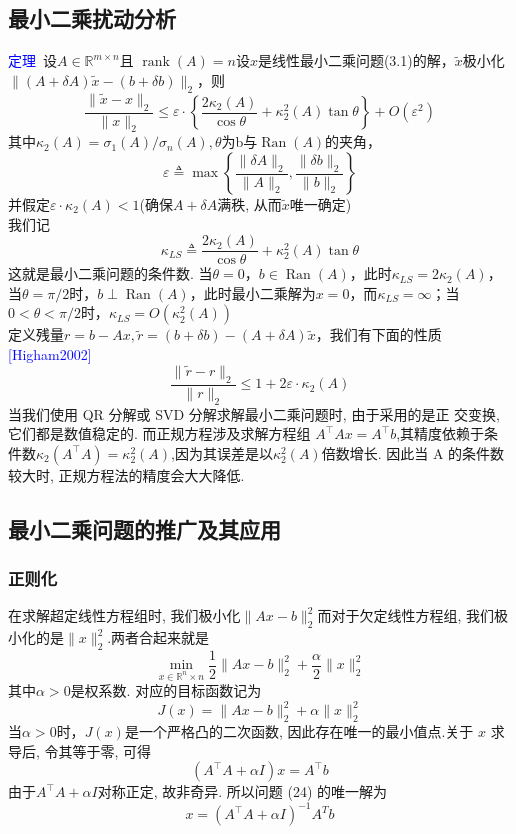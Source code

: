 \documentclass[12pt,a4paper]{article}
\begin{document}
\subsection{最小二乘扰动分析}
\textcolor{blue}{定理}~设$A \in \mathbb{R}^{m \times n}$且
$\operatorname{rank}(A)=n$设$x$是线性最小二乘问题(3.1)的解，$\tilde{x}$极小化$\|(A+\delta A) \tilde{x}-(b+\delta b)\|_{2}$，则
$$
\frac{\|\tilde{x}-x\|_{2}}{\|x\|_{2}} \leq \varepsilon \cdot\left\{\frac{2 \kappa_{2}(A)}{\cos \theta}+\kappa_{2}^{2}(A) \tan \theta\right\}+O\left(\varepsilon^{2}\right)
$$
其中$\kappa_{2}(A)=\sigma_{1}(A) / \sigma_{n}(A), \theta$为b与$\operatorname{Ran}(A)$的夹角，
$$
\varepsilon \triangleq \max \left\{\frac{\|\delta A\|_{2}}{\|A\|_{2}}, \frac{\|\delta b\|_{2}}{\|b\|_{2}}\right\}
$$
并假定$\varepsilon \cdot \kappa_{2}(A)<1$(确保$A+\delta A$满秩, 从而$\tilde{x}$唯一确定)\\
我们记
$$
\kappa_{L S} \triangleq \frac{2 \kappa_{2}(A)}{\cos \theta}+\kappa_{2}^{2}(A) \tan \theta
$$
这就是最小二乘问题的条件数. 当$\theta=0$，$b \in \operatorname{Ran}(A)$，此时$\kappa_{L S}=2 \kappa_{2}(A)$，当$\theta=\pi / 2$时，$b \perp \operatorname{Ran}(A)$，此时最小二乘解为$x=0$，而$\kappa_{L S}=\infty$；当$0<\theta<\pi / 2$时，$\kappa_{L S}=O\left(\kappa_{2}^{2}(A)\right)$\\

定义残量$r=b-A x, \tilde{r}=(b+\delta b)-(A+\delta A) \tilde{x}$，我们有下面的性质 \textcolor{blue}{[Higham2002]}
$$
\frac{\|\tilde{r}-r\|_{2}}{\|r\|_{2}} \leq 1+2 \varepsilon \cdot \kappa_{2}(A)
$$
当我们使用 QR 分解或 SVD 分解求解最小二乘问题时, 由于采用的是正 交变换, 它们都是数值稳定的. 而正规方程涉及求解方程组
$A^{\top} A x=A^{\top} b$,其精度依赖于条件数$\kappa_{2}\left(A^{\top} A\right)=\kappa_{2}^{2}(A)$,因为其误差是以$\kappa_{2}^{2}(A)$倍数增长. 因此当 A 的条件数较大时, 正规方程法的精度会大大降低.\\
\subsection{最小二乘问题的推广及其应用}

\subsubsection{正则化}
在求解超定线性方程组时, 我们极小化$\|A x-b\|_{2}^{2}$而对于欠定线性方程组, 我们极小化的是$\|x\|_{2}^{2}$.两者合起来就是
\begin{equation}
\min _{x \in \mathbb{R}^{n} \times n} \frac{1}{2}\|A x-b\|_{2}^{2}+\frac{\alpha}{2}\|x\|_{2}^{2}
\end{equation}
其中$\alpha>0$是权系数. 对应的目标函数记为
$$
J(x)=\|A x-b\|_{2}^{2}+\alpha\|x\|_{2}^{2}
$$
当$\alpha>0$时，$J(x)$是一个严格凸的二次函数, 因此存在唯一的最小值点.关于 $x$ 求导后, 令其等于零, 可得
$$
\left(A^{\top} A+\alpha I\right) x=A^{\top} b
$$
由于$A^{\top} A+\alpha I$对称正定, 故非奇异. 所以问题 (24) 的唯一解为
$$
x=\left(A^{\top} A+\alpha I\right)^{-1} A^{T} b
$$
\end{document}
